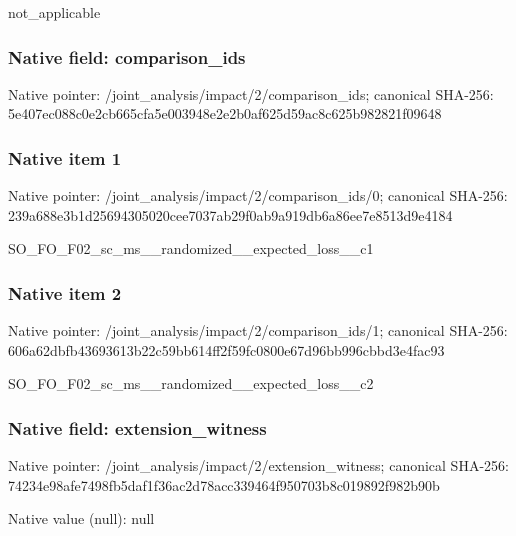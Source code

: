 \documentclass[10pt,a4paper]{article}
\begin{document}
\begingroup\raggedright\sloppy not\_\allowbreak{}applicable\par\endgroup

\subsubsection{Native field: comparison\_\allowbreak{}ids}
Native pointer: /joint\_\allowbreak{}analysis/impact/2/comparison\_\allowbreak{}ids; canonical SHA-256: 5e407ec088c0e2cb665cfa5e003948e2e2b0af625d59ac8c625b982821f09648

\subsubsection{Native item 1}
Native pointer: /joint\_\allowbreak{}analysis/impact/2/comparison\_\allowbreak{}ids/0; canonical SHA-256: 239a688e3b1d25694305020cee7037ab29f0ab9a919db6a86ee7e8513d9e4184

\begingroup\raggedright\sloppy SO\_\allowbreak{}FO\_\allowbreak{}F02\_\allowbreak{}sc\_\allowbreak{}ms\_\allowbreak{}\_\allowbreak{}randomized\_\allowbreak{}\_\allowbreak{}expected\_\allowbreak{}loss\_\allowbreak{}\_\allowbreak{}c1\par\endgroup

\subsubsection{Native item 2}
Native pointer: /joint\_\allowbreak{}analysis/impact/2/comparison\_\allowbreak{}ids/1; canonical SHA-256: 606a62dbfb43693613b22c59bb614ff2f59fc0800e67d96bb996cbbd3e4fac93

\begingroup\raggedright\sloppy SO\_\allowbreak{}FO\_\allowbreak{}F02\_\allowbreak{}sc\_\allowbreak{}ms\_\allowbreak{}\_\allowbreak{}randomized\_\allowbreak{}\_\allowbreak{}expected\_\allowbreak{}loss\_\allowbreak{}\_\allowbreak{}c2\par\endgroup

\subsubsection{Native field: extension\_\allowbreak{}witness}
Native pointer: /joint\_\allowbreak{}analysis/impact/2/extension\_\allowbreak{}witness; canonical SHA-256: 74234e98afe7498fb5daf1f36ac2d78acc339464f950703b8c019892f982b90b

Native value (null): null
\end{document}
